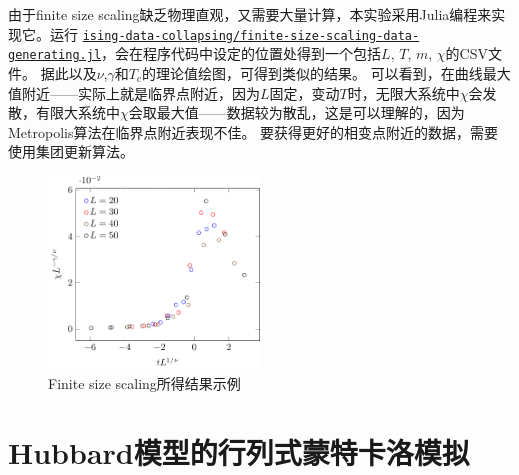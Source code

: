 \documentclass[UTF8]{ctexart}
\begin{document}
由于finite size scaling缺乏物理直观，又需要大量计算，本实验采用Julia编程来实现它。运行
\href{../ising-data-collapsing/ising-data-collapsing/finite-size-scaling-data-generating.jl}{\texttt{ising-data-collapsing/finite-size-scaling-data-generating.jl}}，会在程序代码中设定的位置处得到一个包括$L$, $T$, $m$, $\chi$的CSV文件。
据此以及$\nu$,$\gamma$和$T_\text{c}$的理论值绘图，可得到类似的结果。
可以看到，在曲线最大值附近——实际上就是临界点附近，因为$L$固定，变动$T$时，无限大系统中$\chi$会发散，有限大系统中$\chi$会取最大值——数据较为散乱，这是可以理解的，因为Metropolis算法在临界点附近表现不佳。
要获得更好的相变点附近的数据，需要使用集团更新算法。

\begin{figure}
    \centering
    \includegraphics[width=0.5\textwidth]{../ising-report/../ising-data-collapsing/ising-data-collapsing-run-1.pdf}
    \caption{Finite size scaling所得结果示例}
    \label{fig:finite-size-scaling}
\end{figure}

\section{Hubbard模型的行列式蒙特卡洛模拟}
\end{document}
